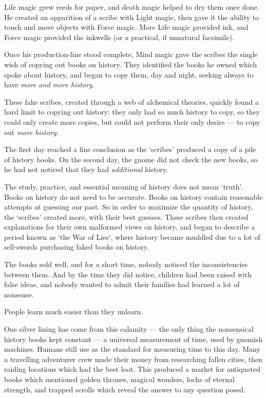 \begin{exampletext}
    Life magic grew reeds for paper, and death magic helped to dry them once done.
    He created an apparition of a scribe with Light magic, then gave it the ability to touch and move objects with Force magic.
    More Life magic provided ink, and Force magic provided the inkwells (or a practical, if unnatural facsimile).

    Once his production-line stood complete, Mind magic gave the scribes the single wish of copying out books on history.
    They identified the books he owned which spoke about history, and began to copy them, day and night, seeking always to have \emph{more and more history}.

    These fake scribes, created through a web of alchemical theories, quickly found a hard limit to copying out history: they only had so much history to copy, so they could only create more copies, but could not perform their only desire --- to copy out \emph{more history}.

    The first day reached a fine conclusion as the `scribes' produced a copy of a pile of history books.
    On the second day, the gnome did not check the new books, so he had not noticed that they had \emph{additional} history.

    The study, practice, and essential meaning of history does not mean `truth'.
    Books on history do not need to be accurate.
    Books on history contain reasonable attempts at guessing our past.
    So in order to maximize the quantity of history, the `scribes' created more, with their best guesses.
    These scribes then created explanations for their own malformed views on history, and began to describe a period known as `the War of Lies`, where history became muddled due to a lot of sell-swords purchasing faked books on history.

    The books sold well, and for a short time, nobody noticed the inconsistencies between them.
    And by the time they did notice, children had been raised with false ideas, and nobody wanted to admit their families had learned a lot of nonsense.

    People learn much easier than they unlearn.

    One silver lining has come from this calamity --- the only thing the nonsensical history books kept constant --- a universal measurement of time, used by gnomish machines.
    Humans still use  as the standard for measuring time to this day.
  \or
    Many a travelling adventurer crew made their money from researching fallen cities, then raiding locations which had the best loot.
    This produced a market for antiquated books which mentioned golden thrones, magical wonders, lochs of eternal strength, and trapped scrolls which reveal the answer to any question posed.


\end{exampletext}
